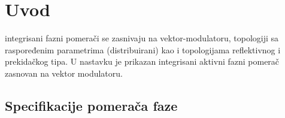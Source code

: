 \documentclass[journal,twocolumn,letterpaper]{IEEEJERM}
\begin{document}

 
%

\IEEEpeerreviewmaketitle

\section{Uvod}

 integrisani fazni pomerači se zasnivaju na vektor-modulatoru, topologiji sa raspoređenim parametrima (distribuirani) kao i topologijama reflektivnog i prekidačkog tipa. U nastavku je prikazan integrisani aktivni fazni pomerač zasnovan na vektor modulatoru. 

\subsection{Specifikacije pomerača faze}
\end{document}
